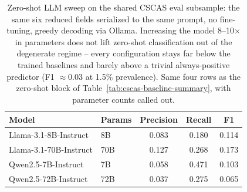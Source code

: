 \begin{table}[htbp]
\centering
\small
\caption{Zero-shot LLM sweep on the shared CSCAS eval subsample: the same six
reduced fields serialized to the same prompt, no fine-tuning, greedy decoding via
Ollama. Increasing the model 8--10$\times$ in parameters does not lift zero-shot
classification out of the degenerate regime -- every configuration stays far
below the trained baselines and barely above a trivial always-positive predictor
(F1 ${\approx}0.03$ at 1.5\% prevalence). Same four rows as the zero-shot block of
Table~\ref{tab:cscas-baseline-summary}, with parameter counts called out.}
\label{tab:cscas-zeroshot-sweep}
\begin{tabular}{llccc}
\toprule
\textbf{Model} & \textbf{Params} & \textbf{Precision} & \textbf{Recall} & \textbf{F1} \\
\midrule
Llama-3.1-8B-Instruct & 8B & 0.083 & 0.180 & 0.114 \\
Llama-3.1-70B-Instruct & 70B & 0.127 & 0.268 & 0.173 \\
Qwen2.5-7B-Instruct & 7B & 0.058 & 0.471 & 0.103 \\
Qwen2.5-72B-Instruct & 72B & 0.037 & 0.275 & 0.065 \\
\bottomrule
\end{tabular}
\end{table}
